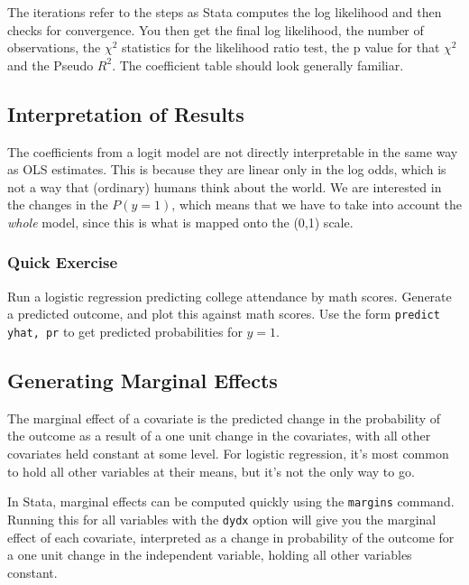 \documentclass[12pt]{article}
\begin{document}
The iterations refer to the steps as Stata computes the log likelihood
and then checks for convergence. You then get the final log
likelihood, the number of observations, the $\chi^2$ statistics for
the likelihood ratio test, the p value for that $\chi^2$ and the
Pseudo $R^2$. The coefficient table should look generally familiar. 


\subsection{Interpretation of Results}

The coefficients from a logit model are not directly interpretable in
the same way as OLS estimates. This is because they are linear only in
the log odds, which is not a way that (ordinary) humans think about
the world. We are interested in the changes in the $P(y=1)$, which
means that we have to take into account the \textit{whole} model,
since this is what is mapped onto the (0,1) scale. 



\subsubsection{Quick Exercise}

Run a logistic regression predicting  college attendance by
math scores. Generate a predicted outcome, and plot this against
math scores. Use the form \texttt{predict yhat, pr} to get predicted
probabilities for $y=1$. 

\subsection{Generating Marginal Effects}

The marginal effect of a covariate is the predicted change in the
probability of the outcome as a result of a one unit change in the
covariates, with all other covariates held constant at some level. For
logistic regression, it's most common to hold all other variables at
their means, but it's not the only way to go. 

In Stata, marginal effects can be computed quickly using the
\texttt{margins} command. Running this for all variables with the
\texttt{dydx} option will give you the marginal effect of each
covariate, interpreted as a change in probability of the outcome for a
one unit change in the independent variable, holding all other
variables constant. 
\end{document}
